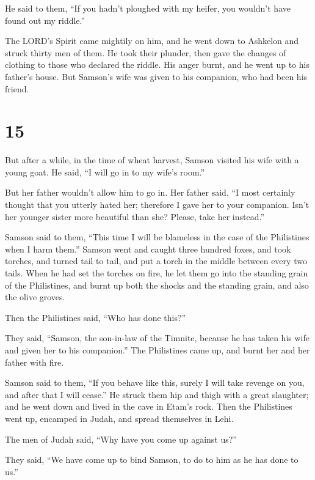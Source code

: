 He said to them, ``If you hadn't ploughed with my heifer, you wouldn't
have found out my riddle.''

 The LORD's Spirit came mightily on him, and he went down
to Ashkelon and struck thirty men of them. He took their plunder, then
gave the changes of clothing to those who declared the riddle. His anger
burnt, and he went up to his father's house.  But Samson's
wife was given to his companion, who had been his friend.

\hypertarget{section-14}{%
\section{15}\label{section-14}}

 But after a while, in the time of wheat harvest, Samson
visited his wife with a young goat. He said, ``I will go in to my wife's
room.''

But her father wouldn't allow him to go in.  Her father
said, ``I most certainly thought that you utterly hated her; therefore I
gave her to your companion. Isn't her younger sister more beautiful than
she? Please, take her instead.''

 Samson said to them, ``This time I will be blameless in the
case of the Philistines when I harm them.''  Samson went and
caught three hundred foxes, and took torches, and turned tail to tail,
and put a torch in the middle between every two tails.  When
he had set the torches on fire, he let them go into the standing grain
of the Philistines, and burnt up both the shocks and the standing grain,
and also the olive groves.

 Then the Philistines said, ``Who has done this?''

They said, ``Samson, the son-in-law of the Timnite, because he has taken
his wife and given her to his companion.'' The Philistines came up, and
burnt her and her father with fire.

 Samson said to them, ``If you behave like this, surely I
will take revenge on you, and after that I will cease.''  He
struck them hip and thigh with a great slaughter; and he went down and
lived in the cave in Etam's rock.  Then the Philistines went
up, encamped in Judah, and spread themselves in Lehi.

 The men of Judah said, ``Why have you come up against
us?''

They said, ``We have come up to bind Samson, to do to him as he has done
to us.''


